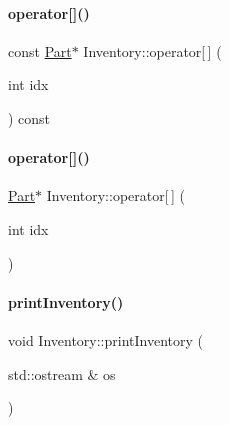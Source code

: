 \mbox{\label{class_inventory_a99b8be25beb3530c47d1faa913633979}} 
\paragraph{\texorpdfstring{operator[]()}{operator[]()}\hspace{0.1cm}{\footnotesize\ttfamily [1/2]}}
{\footnotesize\ttfamily const \mbox{\hyperlink{class_part}{Part}}$\ast$ Inventory\+::operator\mbox{[}$\,$\mbox{]} (\begin{DoxyParamCaption}\item[{int}]{idx }\end{DoxyParamCaption}) const\hspace{0.3cm}{\ttfamily [inline]}}

\mbox{\label{class_inventory_a86601b8ee999e78cdeea83431bab8f33}} 
\paragraph{\texorpdfstring{operator[]()}{operator[]()}\hspace{0.1cm}{\footnotesize\ttfamily [2/2]}}
{\footnotesize\ttfamily \mbox{\hyperlink{class_part}{Part}}$\ast$ Inventory\+::operator\mbox{[}$\,$\mbox{]} (\begin{DoxyParamCaption}\item[{int}]{idx }\end{DoxyParamCaption})\hspace{0.3cm}{\ttfamily [inline]}}

\mbox{\label{class_inventory_ad108e17923ce79c6ab0f9e04c2a6b6c2}} 
\paragraph{\texorpdfstring{printInventory()}{printInventory()}}
{\footnotesize\ttfamily void Inventory\+::print\+Inventory (\begin{DoxyParamCaption}\item[{std\+::ostream \&}]{os }\end{DoxyParamCaption})}

\mbox{\label{class_inventory_a90cb96a50ebc28f0de4a009004e9b192}} 
